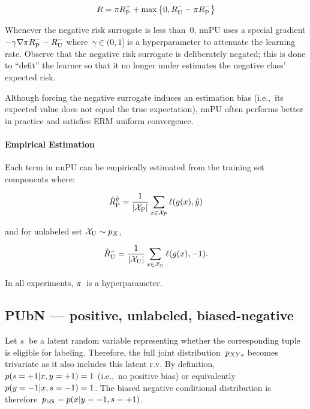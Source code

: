 \begin{equation}\label{eq:Risk:nnPU}
  R = \pi R_{\textnormal{P}}^{{+}} + \max\left\{0, R_{\textnormal{U}}^{{-}} - \pi R_{\textnormal{P}}^{{-}} \right\}
\end{equation}

Whenever the negative risk surrogate is less than~0, nnPU uses a special gradient ${-\gamma \nabla \pi R_{\textnormal{P}}^{{-}} - R_{\textnormal{U}}^{{-}}}$ where~${\gamma \in (0,1]}$ is a hyperparameter to attenuate the learning rate.  Observe that the negative risk surrogate is deliberately negated; this is done to ``defit'' the learner so that it no longer under estimates the negative class' expected risk.

Although forcing the negative surrogate induces an estimation bias (i.e.,~its expected value does not equal the true expectation), nnPU often performs better in practice and satisfies ERM uniform convergence.

\paragraph{Empirical Estimation} Each term in nnPU can be empirically estimated from the training set components where:

\begin{equation}\label{eq:EmpRisk:Pos}
  \hat{R}_{\textnormal{P}}^{\hat{y}} = \frac{1}{\lvert\mathcal{X}_{\textnormal{P}}\rvert} \sum_{x \in \mathcal{X}_{\textnormal{P}}} \ell\mathopen{}\left(g\mathopen{}\left(x\right)\mathclose{},\hat{y}\right)\mathclose{}
\end{equation}

\noindent
and for unlabeled set ${\mathcal{X}_{\textnormal{U}} \sim p_{X}}$,

\begin{equation}
  \hat{R}_{\textnormal{U}}^{-} = \frac{1}{\lvert\mathcal{X}_{\textnormal{U}}\rvert} \sum_{x \in \mathcal{X}_{\textnormal{U}}} \ell\mathopen{}\left(g\mathopen{}\left(x\right)\mathclose{},{-}1\right)\mathclose{} \text{.}
\end{equation}

\noindent
In all experiments, $\pi$~is a hyperparameter.

\subsection{PUbN --- positive, unlabeled, biased-negative}

Let $s$~be a latent random variable representing whether the corresponding tuple is eligible for labeling.  Therefore, the full joint distribution~$p_{XYs}$ becomes trivariate as it also includes this latent r.v.  By definition, ${p(s = {+}1 \vert x, y = {+}1) = 1}$ (i.e.,~no positive bias) or equivalently ${p(y = {-}1 \vert x, s = {-}1) = 1}$.  The biased negative conditional distribution is therefore~${p_{\textnormal{bN}} = p(x \vert y = {-}1, s = {+}1)}$.

